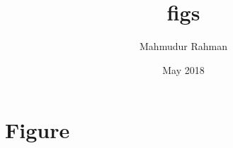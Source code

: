 \documentclass{article}
\title{figs}
\author{Mahmudur Rahman}
\date{May 2018}
\begin{document}
\maketitle

\section{Figure}



\end{document}
